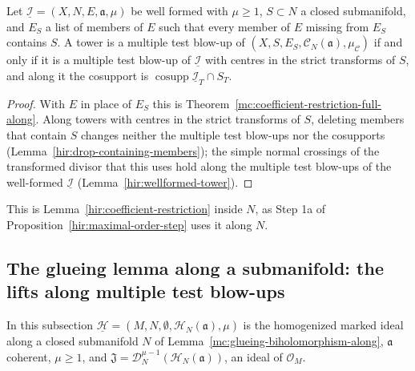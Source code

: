\begin{corollary}
\label{mc:coefficient-restriction-drop-along}
\leanok
Let \(\underline{\mathcal I}=(X,N,E,\mathfrak a,\mu)\) be well formed with \(\mu\ge1\), \(S\subset N\) a closed submanifold, and \(E_S\) a list of members of \(E\) such that every
member of \(E\) missing from \(E_S\) contains \(S\). A tower is a multiple test blow-up of \((X,S,E_S,\mathcal C_N(\mathfrak a),\mu_{\mathcal C})\) if and only if it is a
multiple test blow-up of \(\underline{\mathcal I}\) with centres in the strict transforms of \(S\), and along it the cosupport is
\(\operatorname{cosupp}\underline{\mathcal I}_T\cap S_T\).
\end{corollary}
\begin{proof}
\leanok
With \(E\) in place of \(E_S\) this is Theorem~\ref{mc:coefficient-restriction-full-along}. Along towers with centres in the strict transforms of \(S\), deleting
members that contain \(S\) changes neither the multiple test blow-ups nor the cosupports (Lemma~\ref{hir:drop-containing-members}); the simple normal crossings of
the transformed divisor that this uses hold along the multiple test blow-ups of the well-formed \(\underline{\mathcal I}\) (Lemma~\ref{hir:wellformed-tower}).
\end{proof}
This is Lemma~\ref{hir:coefficient-restriction} inside \(N\), as Step 1a of Proposition~\ref{hir:maximal-order-step} uses it along \(N\).

\subsection{The glueing lemma along a submanifold: the lifts along multiple test blow-ups}

In this subsection \(\underline{\mathcal H}=(M,N,\emptyset,\mathcal H_N(\mathfrak a),\mu)\) is the homogenized marked ideal along a closed submanifold \(N\) of
Lemma~\ref{mc:glueing-biholomorphism-along}, \(\mathfrak a\) coherent, \(\mu\ge1\), and \(\mathfrak J=\mathcal D_N^{\mu-1}(\mathcal H_N(\mathfrak a))\), an ideal of \(\mathcal O_M\).

